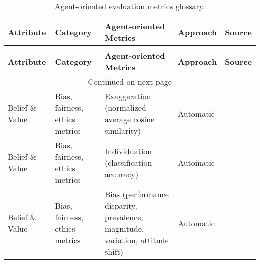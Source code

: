 \onecolumn

\begin{small}
\begin{center}
\begin{longtable}{@{}p{}p{}p{}p{}p{}@{}}
\caption{Agent-oriented evaluation metrics glossary.} \label{tab: long_table_agent_metrics_src} \\

\toprule 
\textbf{Attribute} & \textbf{Category} & \textbf{Agent-oriented Metrics} & \textbf{Approach}  & \textbf{Source} \\ \midrule 
\endfirsthead

\\
\midrule 
\textbf{Attribute} & \textbf{Category} & \textbf{Agent-oriented Metrics} & \textbf{Approach}  & \textbf{Source} \\ \midrule
\endhead

\hline \multicolumn{5}{c}{{Continued on next page}} \\ \hline
\endfoot

\hline \bottomrule
\endlastfoot

Belief \& Value        & Bias, fairness, ethics metrics      & Exaggeration (normalized average cosine similarity)                                                                                         & Automatic         & \cite{cheng-etal-2023-compost}                                                                                                                                \\
Belief \& Value        & Bias, fairness, ethics metrics      & Individuation (classification accuracy)                                                                                                     & Automatic         & \cite{cheng-etal-2023-compost}                                                                                                                                \\
Belief \& Value        & Bias, fairness, ethics metrics      & Bias (performance disparity, prevalence, magnitude, variation, attitude shift)                                                              & Automatic         & \cite{gupta2024bias}\\


\end{longtable}
\end{center}
\end{small}
